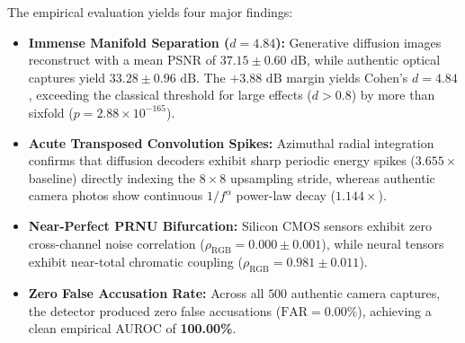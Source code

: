 \documentclass[11pt]{article}
\theoremstyle{definition}
\begin{document}
The empirical evaluation yields four major findings:
\begin{itemize}
    \item \textbf{Immense Manifold Separation ($d = 4.84$):} Generative diffusion images reconstruct with a mean PSNR of $37.15 \pm 0.60\text{ dB}$, while authentic optical captures yield $33.28 \pm 0.96\text{ dB}$. The $+3.88\text{ dB}$ margin yields Cohen's $d = 4.84$, exceeding the classical threshold for large effects ($d > 0.8$) by more than sixfold ($p = 2.88 \times 10^{-165}$).
    \item \textbf{Acute Transposed Convolution Spikes:} Azimuthal radial integration confirms that diffusion decoders exhibit sharp periodic energy spikes ($3.655\times$ baseline) directly indexing the $8\times 8$ upsampling stride, whereas authentic camera photos show continuous $1/f^\alpha$ power-law decay ($1.144\times$).
    \item \textbf{Near-Perfect PRNU Bifurcation:} Silicon CMOS sensors exhibit zero cross-channel noise correlation ($\rho_{\text{RGB}} = 0.000 \pm 0.001$), while neural tensors exhibit near-total chromatic coupling ($\rho_{\text{RGB}} = 0.981 \pm 0.011$).
    \item \textbf{Zero False Accusation Rate:} Across all $500$ authentic camera captures, the detector produced zero false accusations ($\text{FAR} = 0.00\%$), achieving a clean empirical AUROC of \textbf{100.00\%}.
\end{itemize}
\end{document}
